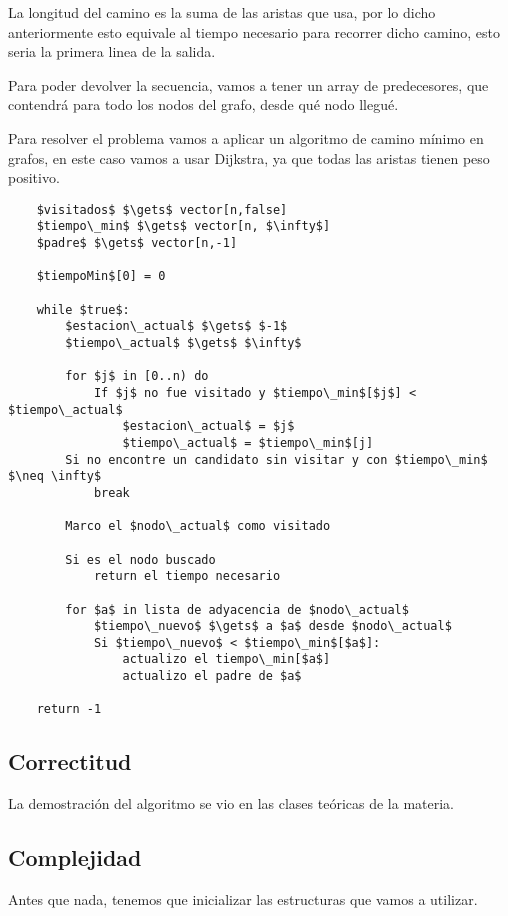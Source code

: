 La longitud del camino es la suma de las aristas que usa, por lo dicho anteriormente esto equivale al tiempo necesario para recorrer dicho camino, esto seria la primera linea de la salida.

Para poder devolver la secuencia, vamos a tener un array de predecesores, que contendrá para todo los nodos del grafo, desde qué nodo llegué.

Para resolver el problema vamos a aplicar un algoritmo de camino mínimo en grafos, en este caso vamos a usar Dijkstra, ya que todas las aristas tienen peso positivo.

\begin{lstlisting}
    $visitados$ $\gets$ vector[n,false]
    $tiempo\_min$ $\gets$ vector[n, $\infty$]
    $padre$ $\gets$ vector[n,-1]

    $tiempoMin$[0] = 0

    while $true$:
        $estacion\_actual$ $\gets$ $-1$
        $tiempo\_actual$ $\gets$ $\infty$

        for $j$ in [0..n) do
            If $j$ no fue visitado y $tiempo\_min$[$j$] < $tiempo\_actual$
                $estacion\_actual$ = $j$
                $tiempo\_actual$ = $tiempo\_min$[j]
        Si no encontre un candidato sin visitar y con $tiempo\_min$ $\neq \infty$
            break

        Marco el $nodo\_actual$ como visitado

        Si es el nodo buscado
            return el tiempo necesario

        for $a$ in lista de adyacencia de $nodo\_actual$
            $tiempo\_nuevo$ $\gets$ a $a$ desde $nodo\_actual$
            Si $tiempo\_nuevo$ < $tiempo\_min$[$a$]:
                actualizo el tiempo\_min[$a$]
                actualizo el padre de $a$

    return -1
   \end{lstlisting}

\subsection{Correctitud}

La demostración del algoritmo se vio en las clases teóricas de la materia.

\subsection{Complejidad}
Antes que nada, tenemos que inicializar las estructuras que vamos a utilizar.

